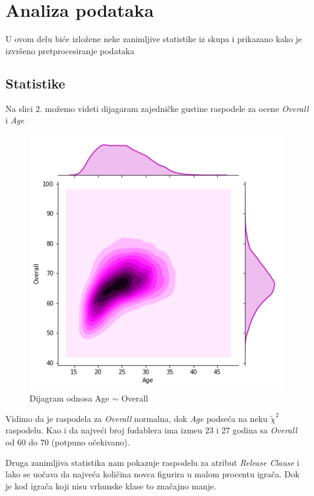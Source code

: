 \documentclass[a4paper, 11pt]{article}
\begin{document}
\section{Analiza podataka}

U ovom delu bi\'{c}e izlo\v{z}ene neke zanimljive statistike iz skupa
i prikazano kako je izvr\v{s}eno pretprocesiranje podataka

\subsection{Statistike}
Na slici 2. mo\v{z}emo videti dijagaram zajedni\v{c}ke gustine raspodele
za ocene \emph{Overall} i \emph{Age}

\begin{figure}[h]
\centering
\graphicspath{{../}}
\includegraphics[scale=0.45]{stat1.png}
\caption{Dijagram odnosa Age $\sim$ Overall}

\end{figure}

Vidimo da je raspodela za \emph{Overall} normalna, dok
\emph{Age} podse\'{c}a na neku $\tilde{\chi}^2$ raspodelu.
Kao i da najve\'{c}i broj fudablera ima izme\dj{}u 23 i 27 godina
sa \emph{Overall} od 60 do 70 (potpuno o\v{c}ekivano).

\pagebreak

Druga zanimljiva statistika nam pokazuje raspodelu za atribut
\emph{Release Clause} i lako se uo\v{c}ava da najve\'{c}a koli\v{c}ina
novca figurira  u malom procentu igra\v{c}a. Dok je kod igra\v{c}a
koji nisu vrhunske klase to zna\v{c}ajno manje.
\end{document}
